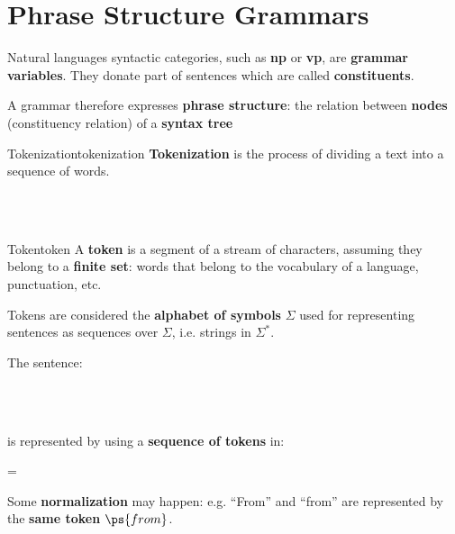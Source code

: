 \section{Phrase Structure Grammars}\label{sec:lm_phrase_structure_grammars} %
Natural languages syntactic categories, such as \textbf{\ac{np}} or \textbf{\ac{vp}}, are \textbf{grammar variables}.
They donate part of sentences which are called \textbf{constituents}.
\begin{note}
    A grammar therefore expresses \textbf{phrase structure}: the relation between \textbf{nodes} (constituency relation) of a \textbf{syntax tree}
\end{note}
\begin{definition}{Tokenization}{tokenization}
    \textbf{Tokenization} is the process of dividing a text into a sequence of words.
    \begin{example}{}{}
        \begin{ceq}
             \\
             \\
        \end{ceq}
    \end{example}
\end{definition}
\begin{definition}{Token}{token}
    A \textbf{token} is a segment of a stream of characters, assuming they belong to a \textbf{finite set}: words that belong to the vocabulary of a language, punctuation, etc.
\end{definition}
Tokens are considered the \textbf{alphabet of symbols} $\Sigma$ used for representing sentences as sequences over $\Sigma$, i.e. strings in $\Sigma^*$.
\begin{example}{}{}
    The sentence:
    \begin{ceq}
         \\
         \\
    \end{ceq}
    is represented by using a \textbf{sequence of tokens} in:
    \begin{ceq}
        \Sigma = 
    \end{ceq}
    \begin{note}
        Some \textbf{normalization} may happen: e.g. ``From'' and ``from'' are represented by the \textbf{same token} $\ps{from}$.
    \end{note}
\end{example}
